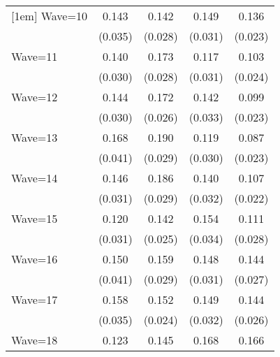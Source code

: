 {\begin{tabular}{l*{4}{c}}
[1em]
Wave=10             &       0.143\sym{***}&       0.142\sym{***}&       0.149\sym{***}&       0.136\sym{***}\\
                    &     (0.035)         &     (0.028)         &     (0.031)         &     (0.023)         \\
[1em]
Wave=11             &       0.140\sym{***}&       0.173\sym{***}&       0.117\sym{***}&       0.103\sym{***}\\
                    &     (0.030)         &     (0.028)         &     (0.031)         &     (0.024)         \\
[1em]
Wave=12             &       0.144\sym{***}&       0.172\sym{***}&       0.142\sym{***}&       0.099\sym{***}\\
                    &     (0.030)         &     (0.026)         &     (0.033)         &     (0.023)         \\
[1em]
Wave=13             &       0.168\sym{***}&       0.190\sym{***}&       0.119\sym{***}&       0.087\sym{***}\\
                    &     (0.041)         &     (0.029)         &     (0.030)         &     (0.023)         \\
[1em]
Wave=14             &       0.146\sym{***}&       0.186\sym{***}&       0.140\sym{***}&       0.107\sym{***}\\
                    &     (0.031)         &     (0.029)         &     (0.032)         &     (0.022)         \\
[1em]
Wave=15             &       0.120\sym{***}&       0.142\sym{***}&       0.154\sym{***}&       0.111\sym{***}\\
                    &     (0.031)         &     (0.025)         &     (0.034)         &     (0.028)         \\
[1em]
Wave=16             &       0.150\sym{***}&       0.159\sym{***}&       0.148\sym{***}&       0.144\sym{***}\\
                    &     (0.041)         &     (0.029)         &     (0.031)         &     (0.027)         \\
[1em]
Wave=17             &       0.158\sym{***}&       0.152\sym{***}&       0.149\sym{***}&       0.144\sym{***}\\
                    &     (0.035)         &     (0.024)         &     (0.032)         &     (0.026)         \\
[1em]
Wave=18             &       0.123\sym{***}&       0.145\sym{***}&       0.168\sym{***}&       0.166\sym{***}\\

\end{tabular}}
